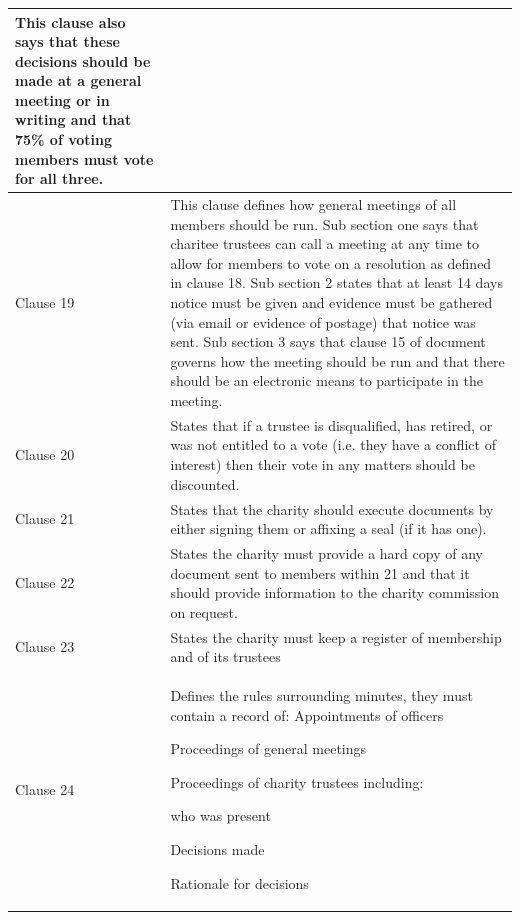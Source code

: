 \documentclass{UoYCSproject}
\begin{document}
\begin{longtable}{|p{}|p{}|}
This clause also says that these decisions should be made at a general meeting or in writing and that 75\% of voting members must vote for all three. \\\hline
  Clause 19 & 
          This clause defines how general meetings of all members should be run. Sub section one says that charitee trustees can call a meeting at any time to allow for members to vote on a resolution as defined in clause 18. Sub section 2 states that at least 14 days notice must be given and evidence must be gathered (via email or evidence of postage) that notice was sent. Sub section 3 says that clause 15 of document governs how the meeting should be run and that there should be an electronic means to participate in the meeting. \\\hline
  Clause 20 & 
          States that if a trustee is disqualified, has retired, or was not entitled to a vote (i.e. they have a conflict of interest) then their vote in any matters should be discounted. \\\hline
  Clause 21 & 
          States that the charity should execute documents by either signing them or affixing a seal (if it has one). \\\hline
  Clause 22 & 
          States the charity must provide a hard copy of any document sent to members within 21 and that it should provide information to the charity commission on request. \\\hline
  Clause 23 & 
          States the charity must keep a register of membership and of its trustees \\\hline
  Clause 24 & 
          Defines the rules surrounding minutes, they must contain a record of:
Appointments of officers 

Proceedings of general meetings

Proceedings of charity trustees including:

who was present

Decisions made

Rationale for decisions


\end{longtable}
\end{document}
